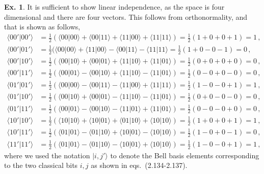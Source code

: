 \documentclass[a4paper,12pt]{article}
\theoremstyle{definition}
\newtheorem{exercise}{Ex.}[section]
\begin{document}
\begin{exercise}\label{ex:Bellstates}
 It is sufficient to show linear independence, as the space is four dimensional and there are four vectors. This follows from orthonormality, and that is shown as follows,
 \[
  \begin{aligned}
   \langle 00'|00'\rangle &= \frac{1}{2}(\langle 00|00\rangle + \langle 00|11\rangle + \langle 11|00\rangle + \langle 11|11\rangle) = \frac{1}{2}(1+0+0+1)=1\,,\\
   \langle 00'|01'\rangle &= \frac{1}{2}(\langle 00|00\rangle + \langle 11|00\rangle - \langle 00|11\rangle -\langle 11|11\rangle = \frac{1}{2}(1+0-0-1)=0\,,\\
   \langle 00'|10'\rangle &= \frac{1}{2}(\langle 00 | 10\rangle + \langle 00|01\rangle + \langle 11|10\rangle + \langle 11|01\rangle)=\frac{1}{2}(0+0+0+0)=0\,,\\
   \langle 00'|11'\rangle &= \frac{1}{2}(\langle 00|01\rangle - \langle 00|10\rangle + \langle 11|10\rangle - \langle 11|01\rangle)=\frac{1}{2}(0-0+0-0)=0\,,\\
   \langle 01'|01'\rangle &=\frac{1}{2}(\langle 00|00\rangle - \langle 00|11\rangle -\langle 11|00\rangle + \langle 11|11\rangle)=\frac{1}{2}(1-0-0+1)=1\,,\\
   \langle 01'|10'\rangle &= \frac{1}{2}(\langle 00|10\rangle +\langle 00|01\rangle - \langle 11|10\rangle - \langle 11|01\rangle)=\frac{1}{2}(0+0-0-0)=0\,,\\
   \langle 01'|11'\rangle &= \frac{1}{2}(\langle 00|01\rangle - \langle 00|10\rangle -\langle 11|01\rangle + \langle 11|01\rangle)=\frac{1}{2}(0-0-0+0) =0\,,\\
   \langle 10'|10'\rangle &= \frac{1}{2}(\langle 10|10\rangle + \langle 10|01\rangle + \langle 01| 10\rangle + \langle 10|10\rangle) = \frac{1}{2}(1+0+0+1)=1\,,\\
   \langle 10'|11'\rangle &= \frac{1}{2}(\langle 01|01\rangle - \langle 01|10\rangle + \langle 10|01\rangle - \langle 10|10\rangle) = \frac{1}{2}(1-0+0-1)=0\,,\\
   \langle 11'|11'\rangle &=\frac{1}{2}(\langle 01|01\rangle - \langle 01|10\rangle -\langle 10|01\rangle + \langle 10|10\rangle)=\frac{1}{2}(1-0-0+1)=1\,,
  \end{aligned}
 \]
 where we used the notation $|i,j'\rangle$ to denote the Bell basis elements corresponding to the two classical bits $i,j$ as shown in eqs.\ (2.134-2.137).
\end{exercise}
\end{document}
